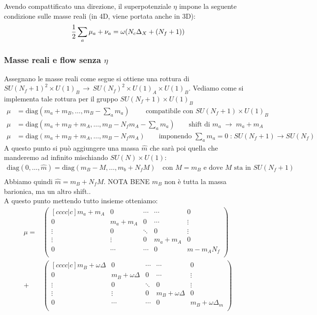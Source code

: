 \documentclass[a4paper,12pt]{article}
\begin{document}
Avendo compattificato una direzione, il superpotenziale $\eta$ impone la seguente condizione sulle masse reali (in 4D, viene portata anche in 3D):
\begin{equation}
  { 1 \over 2 } \sum_a \mu_a + \nu_a  = \omega ( N_c \Delta_X + (N_f+1))
  \label{eqn:R-symm Anomaly}
\end{equation}
\subsubsection{Masse reali e flow senza $\eta$}

Assegnano le masse reali come segue si ottiene una rottura di $ SU(N_f+1)^2 \times U(1)_B \, \rightarrow \, SU(N_f)^2 \times U(1)_A \times U(1)_B$. Vediamo come si implementa tale rottura per il gruppo $SU(N_f+1) \times U(1)_B$
\begin{align*}
\mu &= \mbox{diag} ( m_a + m_B , \dots, m_B - \sum_a m_a) \qquad \mbox{ compatibile con } SU(N_f+1) \times U(1)_B \\
\mu &= \mbox{diag} ( m_a + m_B + m_A , \dots , m_B - N_f m_A - \sum_a m_a) \qquad \mbox{shift di } m_a \; \rightarrow \; m_a + m_A \\
\mu &= \mbox{diag} ( m_a + m_B + m_A , \dots , m_B - N_f m_A ) \qquad \mbox{imponendo } \sum_a m_a = 0 \;\mbox{:}\; SU(N_f+1) \rightarrow SU(N_f)
\end{align*}
A questo punto si può aggiungere una massa $\hat{m}$ che sarà poi quella che manderemo ad infinito mischiando $SU(N) \times U(1)$: 
\begin{align*}
\mbox{diag}(0, \dots , \hat{m} ) = \mbox{diag} (m_B - M, \dots , m_b + N_f M) \quad \mbox{con } M = m_B \mbox{ e dove $M$ sta in } SU(N_f+1) \\
\end{align*}
Abbiamo quindi $\hat{m} = m_B + N_f M$. NOTA BENE $m_B$ non è tutta la massa barionica, ma un altro shift..\\
A questo punto mettendo tutto insieme otteniamo:
\begin{align*}
\mu = &
\begin{pmatrix}[c c c c|c]
		m_a + m_A 	& 0 		& \cdots 	& \cdots 	& 0 \\
		0 			 & m_a + m_A & 0 &\cdots & \vdots \\
		\vdots 		& 0 		& \ddots & 0 & \vdots \\
		\vdots & \vdots & 0 & m_a + m_A & 0 \\
		\hline 
		0 & \cdots & \cdots & 0 & m  - m_A N_f\\
\end{pmatrix} \\
+ &
\begin{pmatrix}[c c c c|c]
		m_B + \omega \Delta 	& 0 		& \cdots 	& \cdots 	& 0 \\
		0 			 & m_B + \omega \Delta & 0 &\cdots & \vdots \\
		\vdots 		& 0 		& \ddots & 0 & \vdots \\
		\vdots & \vdots & 0 & m_B + \omega \Delta & 0 \\
		\hline 
		0 & \cdots & \cdots & 0 &  m_B + \omega \Delta_m\\
\end{pmatrix}
\end{align*}
\end{document}
